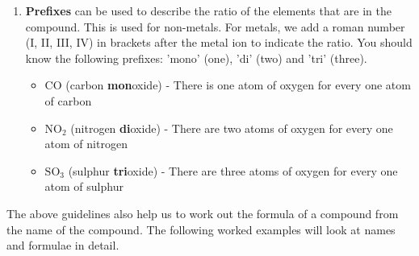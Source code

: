 \begin{enumerate}[noitemsep, label=\textbf{\arabic*}. ]
\begin{table}[H]
\begin{center}
 \end{center}
\caption{Table of anions}
\label{tab:anions}
\end{table}

\label{m38708*uid43}\item \textbf{Prefixes} can be used to describe the ratio of the elements that are in the compound. This is used for non-metals. For metals, we add a roman number (I, II, III, IV) in brackets after the metal ion to indicate the ratio. You should know the following prefixes: 'mono' (one), 'di' (two) and 'tri' (three).
\label{m38708*id64977}\begin{itemize}[noitemsep]
            \label{m38708*uid44}\item $\text{CO}$ (carbon \textbf{mon}oxide) - There is one atom of oxygen for every one atom of carbon
\label{m38708*uid45}\item $\text{NO}{}_{2}$ (nitrogen \textbf{di}oxide) - There are two atoms of oxygen for every one atom of nitrogen
\label{m38708*uid46}\item $\text{SO}{}_{3}$ (sulphur \textbf{tri}oxide) - There are three atoms of oxygen for every one atom of sulphur
\end{itemize}
        \end{enumerate}
\label{m38708*id537402}The above guidelines also help us to work out the formula of a compound from the name of the compound. The following worked examples will look at names and formulae in detail.\\
